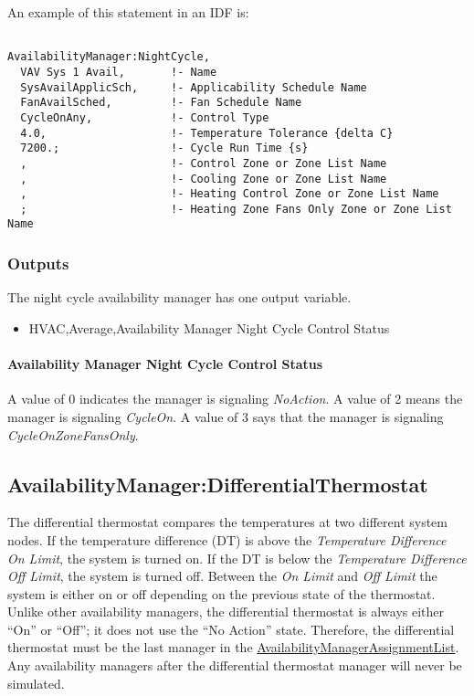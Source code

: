 An example of this statement in an IDF is:

\begin{lstlisting}

AvailabilityManager:NightCycle,
  VAV Sys 1 Avail,       !- Name
  SysAvailApplicSch,     !- Applicability Schedule Name
  FanAvailSched,         !- Fan Schedule Name
  CycleOnAny,            !- Control Type
  4.0,                   !- Temperature Tolerance {delta C}
  7200.;                 !- Cycle Run Time {s}
  ,                      !- Control Zone or Zone List Name
  ,                      !- Cooling Zone or Zone List Name
  ,                      !- Heating Control Zone or Zone List Name
  ;                      !- Heating Zone Fans Only Zone or Zone List Name
\end{lstlisting}

\subsubsection{Outputs}\label{outputs-2-022}

The night cycle availability manager has one output variable.

\begin{itemize}
\tightlist
\item
  HVAC,Average,Availability Manager Night Cycle Control Status
\end{itemize}

\paragraph{Availability Manager Night Cycle Control Status}\label{availability-manager-night-cycle-control-status}

A value of 0 indicates the manager is signaling \emph{NoAction}. A value of 2 means the manager is signaling \emph{CycleOn}. A value of 3 says that the manager is signaling \emph{CycleOnZoneFansOnly}.

\subsection{AvailabilityManager:DifferentialThermostat}\label{availabilitymanagerdifferentialthermostat}

The differential thermostat compares the temperatures at two different system nodes. If the temperature difference (DT) is above the \emph{Temperature Difference On Limit}, the system is turned on. If the DT is below the \emph{Temperature Difference Off Limit}, the system is turned off. Between the \emph{On Limit} and \emph{Off Limit} the system is either on or off depending on the previous state of the thermostat. Unlike other availability managers, the differential thermostat is always either ``On'' or ``Off''; it does not use the ``No Action'' state. Therefore, the differential thermostat must be the last manager in the \hyperref[availabilitymanagerassignmentlist]{AvailabilityManagerAssignmentList}. Any availability managers after the differential thermostat manager will never be simulated.

